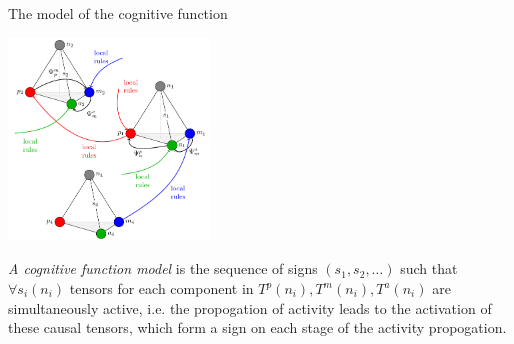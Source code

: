 \documentclass[default]{beamer}
\begin{document}
	\begin{frame}{The model of the cognitive function}
		\begin{center}
			\includegraphics[width=0.4\textwidth]{sign-schemas/cognitive_function}
		\end{center}
		\textit{A cognitive function model} is the sequence of signs $({s}_{1}, {s}_{2},\dots)$ such that $\forall {{s}_{i}}({{n}_{i}})$ tensors for each component in ${{T}^{p}}({{n}_{i}}),{{T}^{m}}({{n}_{i}}),{{T}^{a}}({{n}_{i}})$ are simultaneously active, i.e. the propogation of activity leads to the activation of these causal tensors, which form a sign on each stage of the activity propogation.
	\end{frame}
\end{document}
